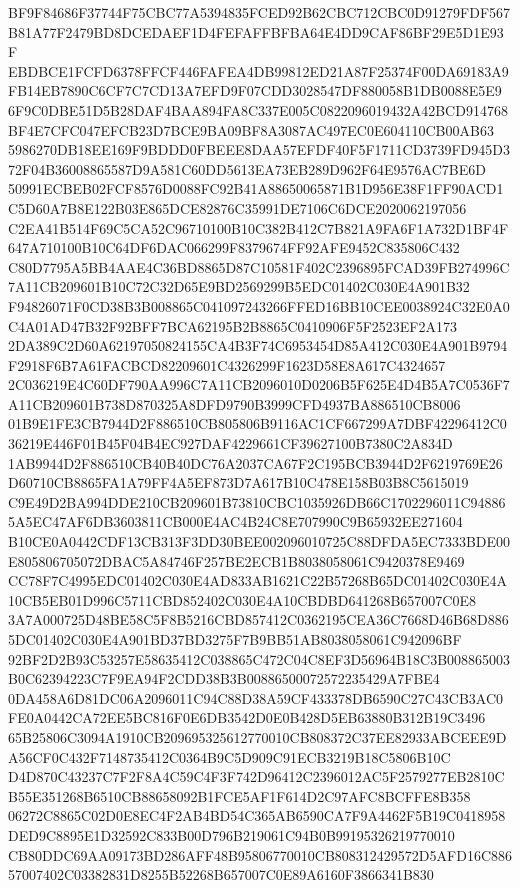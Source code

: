 \documentclass[UTF8,fontset=fandol,zihao=-4,a4paper]{ctexart}
\begin{document}
{{BF9F84686F37744F75CBC77A5394835FCED92B62CBC712CBC0D91279FDF567B81A77F2479BD8DCEDAEF1D4FEFAFFBFBA64E4DD9CAF86BF29E5D1E93F
EBDBCE1FCFD6378FFCF446FAFEA4DB99812ED21A87F25374F00DA69183A9FB14EB7890C6CF7C7CD13A7EFD9F07CDD3028547DF880058B1DB0088E5E9
6F9C0DBE51D5B28DAF4BAA894FA8C337E005C0822096019432A42BCD914768BF4E7CFC047EFCB23D7BCE9BA09BF8A3087AC497EC0E604110CB00AB63
5986270DB18EE169F9BDDD0FBEEE8DAA57EFDF40F5F1711CD3739FD945D372F04B36008865587D9A581C60DD5613EA73EB289D962F64E9576AC7BE6D
50991ECBEB02FCF8576D0088FC92B41A88650065871B1D956E38F1FF90ACD1C5D60A7B8E122B03E865DCE82876C35991DE7106C6DCE2020062197056
C2EA41B514F69C5CA52C96710100B10C382B412C7B821A9FA6F1A732D1BF4F647A710100B10C64DF6DAC066299F8379674FF92AFE9452C835806C432
C80D7795A5BB4AAE4C36BD8865D87C10581F402C2396895FCAD39FB274996C7A11CB209601B10C72C32D65E9BD2569299B5EDC01402C030E4A901B32
F94826071F0CD38B3B008865C041097243266FFED16BB10CEE0038924C32E0A0C4A01AD47B32F92BFF7BCA62195B2B8865C0410906F5F2523EF2A173
2DA389C2D60A62197050824155CA4B3F74C6953454D85A412C030E4A901B9794F2918F6B7A61FACBCD82209601C4326299F1623D58E8A617C4324657
2C036219E4C60DF790AA996C7A11CB2096010D0206B5F625E4D4B5A7C0536F7A11CB209601B738D870325A8DFD9790B3999CFD4937BA886510CB8006
01B9E1FE3CB7944D2F886510CB805806B9116AC1CF667299A7DBF42296412C036219E446F01B45F04B4EC927DAF4229661CF39627100B7380C2A834D
1AB9944D2F886510CB40B40DC76A2037CA67F2C195BCB3944D2F6219769E26D60710CB8865FA1A79FF4A5EF873D7A617B10C478E158B03B8C5615019
C9E49D2BA994DDE210CB209601B73810CBC1035926DB66C1702296011C948865A5EC47AF6DB3603811CB000E4AC4B24C8E707990C9B65932EE271604
B10CE0A0442CDF13CB313F3DD30BEE002096010725C88DFDA5EC7333BDE00E805806705072DBAC5A84746F257BE2ECB1B8038058061C9420378E9469
CC78F7C4995EDC01402C030E4AD833AB1621C22B57268B65DC01402C030E4A10CB5EB01D996C5711CBD852402C030E4A10CBDBD641268B657007C0E8
3A7A000725D48BE58C5F8B5216CBD857412C0362195CEA36C7668D46B68D8865DC01402C030E4A901BD37BD3275F7B9BB51AB8038058061C942096BF
92BF2D2B93C53257E58635412C038865C472C04C8EF3D56964B18C3B008865003B0C62394223C7F9EA94F2CDD38B3B00886500072572235429A7FBE4
0DA458A6D81DC06A2096011C94C88D38A59CF433378DB6590C27C43CB3AC0FE0A0442CA72EE5BC816F0E6DB3542D0E0B428D5EB63880B312B19C3496
65B25806C3094A1910CB209695325612770010CB808372C37EE82933ABCEEE9DA56CF0C432F7148735412C0364B9C5D909C91ECB3219B18C5806B10C
D4D870C43237C7F2F8A4C59C4F3F742D96412C2396012AC5F2579277EB2810CB55E351268B6510CB88658092B1FCE5AF1F614D2C97AFC8BCFFE8B358
06272C8865C02D0E8EC4F2AB4BD54C365AB6590CA7F9A4462F5B19C0418958DED9C8895E1D32592C833B00D796B219061C94B0B99195326219770010
CB80DDC69AA09173BD286AFF48B95806770010CB808312429572D5AFD16C88657007402C03382831D8255B52268B657007C0E89A6160F3866341B830
}}
\end{document}
